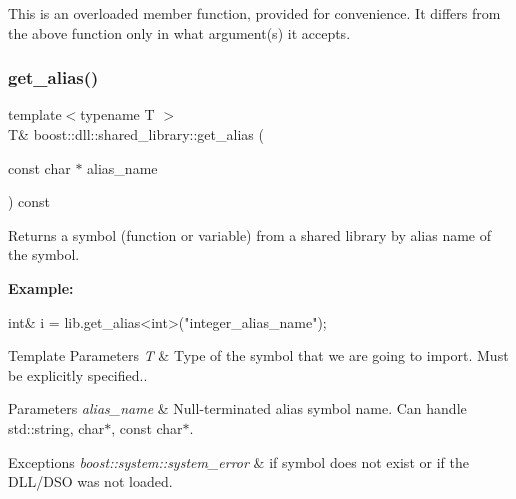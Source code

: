 This is an overloaded member function, provided for convenience. It differs from the above function only in what argument(s) it accepts. \mbox{\label{a01708_a7a61c13a5bb5286c2e31300b8927effc}} 
\subsubsection{\texorpdfstring{get\+\_\+alias()}{get\_alias()}\hspace{0.1cm}{\footnotesize\ttfamily [1/2]}}
{\footnotesize\ttfamily template$<$typename T $>$ \\
T\& boost\+::dll\+::shared\+\_\+library\+::get\+\_\+alias (\begin{DoxyParamCaption}\item[{const char $\ast$}]{alias\+\_\+name }\end{DoxyParamCaption}) const\hspace{0.3cm}{\ttfamily [inline]}}

Returns a symbol (function or variable) from a shared library by alias name of the symbol.

{\bfseries Example\+:} 
\begin{DoxyCode}
\textcolor{keywordtype}{int}& i = lib.get\_alias<\textcolor{keywordtype}{int}>(\textcolor{stringliteral}{"integer\_alias\_name"});
\end{DoxyCode}



\begin{DoxyTemplParams}{Template Parameters}
{\em T} & Type of the symbol that we are going to import. Must be explicitly specified.. \\
\hline
\end{DoxyTemplParams}

\begin{DoxyParams}{Parameters}
{\em alias\+\_\+name} & Null-\/terminated alias symbol name. Can handle std\+::string, char$\ast$, const char$\ast$. \\
\hline
\end{DoxyParams}

\begin{DoxyExceptions}{Exceptions}
{\em boost\+::system\+::system\+\_\+error} & if symbol does not exist or if the D\+L\+L/\+D\+SO was not loaded. \\
\hline
\end{DoxyExceptions}
\mbox{\label{a01708_a8dd4c80c4a6396d33f397bc35b969d83}} 

